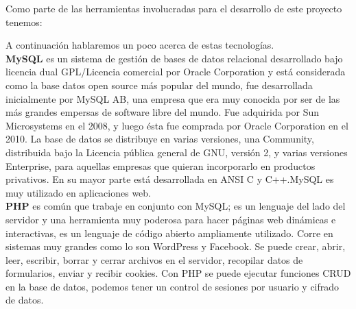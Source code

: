 \documentclass[a4paper,openright,11pt]{article}
\begin{document}
Como parte de las herramientas involucradas para el desarrollo de este proyecto tenemos:\\
\begin{table}[H]
	\begin{center}
	\end{center}
	\caption{Tecnologías Involucradas}
\end{table}
A continuación hablaremos un poco acerca de estas tecnologías.\\

\textbf{MySQL} es un sistema de gestión de bases de datos relacional desarrollado bajo licencia dual GPL/Licencia comercial por Oracle Corporation y está considerada como la base datos open source más popular del mundo, fue desarrollada inicialmente por MySQL AB, una empresa que era muy conocida por ser de las más grandes empersas de software libre del mundo. Fue adquirida por Sun Microsystems en el 2008, y luego ésta fue comprada por Oracle Corporation en el 2010. La base de datos se distribuye en varias versiones, una Community, distribuida bajo la Licencia pública general de GNU, versión 2, y varias versiones Enterprise, para aquellas empresas que quieran incorporarlo en productos privativos. En su mayor parte está desarrollada en ANSI C y C++.MySQL es muy utilizado en aplicaciones web.\\

\textbf{PHP} es común que trabaje en conjunto con MySQL; es un lenguaje del lado del servidor y una herramienta muy poderosa para hacer páginas web dinámicas e interactivas, es un lenguaje de código abierto ampliamente utilizado. Corre en sistemas muy grandes como lo son WordPress y Facebook. Se puede crear, abrir, leer, escribir, borrar y cerrar archivos en el servidor, recopilar datos de formularios, enviar y recibir cookies. Con PHP se puede ejecutar funciones CRUD en la base de datos, podemos tener un control de sesiones por usuario y cifrado de datos.\\
\end{document}

